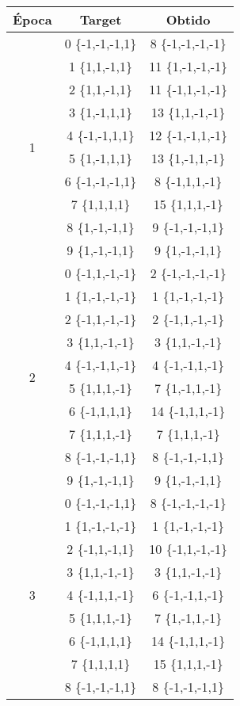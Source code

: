 \begin{table}[H]
\centering
\begin{tabular}{|c|c|c|}
\hline
Época  & Target  &Obtido  \\ \hline
\multirow{10}{*}{1}	 & 0 \{-1,-1,-1,1\} & 8 \{-1,-1,-1,-1\} \\
	 & 1 \{1,1,-1,1\} & 11 \{1,-1,-1,-1\} \\
	 & 2 \{1,1,-1,1\} & 11 \{-1,1,-1,-1\} \\
	 & 3 \{1,-1,1,1\} & 13 \{1,1,-1,-1\} \\
	 & 4 \{-1,-1,1,1\} & 12 \{-1,-1,1,-1\} \\
	 & 5 \{1,-1,1,1\} & 13 \{1,-1,1,-1\} \\
	 & 6 \{-1,-1,-1,1\} & 8 \{-1,1,1,-1\} \\
	 & 7 \{1,1,1,1\} & 15 \{1,1,1,-1\} \\
	 & 8 \{1,-1,-1,1\} & 9 \{-1,-1,-1,1\} \\
	 & 9 \{1,-1,-1,1\} & 9 \{1,-1,-1,1\} \\\hline
\multirow{10}{*}{2}	 & 0 \{-1,1,-1,-1\} & 2 \{-1,-1,-1,-1\} \\
	 & 1 \{1,-1,-1,-1\} & 1 \{1,-1,-1,-1\} \\
	 & 2 \{-1,1,-1,-1\} & 2 \{-1,1,-1,-1\} \\
	 & 3 \{1,1,-1,-1\} & 3 \{1,1,-1,-1\} \\
	 & 4 \{-1,-1,1,-1\} & 4 \{-1,-1,1,-1\} \\
	 & 5 \{1,1,1,-1\} & 7 \{1,-1,1,-1\} \\
	 & 6 \{-1,1,1,1\} & 14 \{-1,1,1,-1\} \\
	 & 7 \{1,1,1,-1\} & 7 \{1,1,1,-1\} \\
	 & 8 \{-1,-1,-1,1\} & 8 \{-1,-1,-1,1\} \\
	 & 9 \{1,-1,-1,1\} & 9 \{1,-1,-1,1\} \\\hline
\multirow{10}{*}{3}	 & 0 \{-1,-1,-1,1\} & 8 \{-1,-1,-1,-1\} \\
	 & 1 \{1,-1,-1,-1\} & 1 \{1,-1,-1,-1\} \\
	 & 2 \{-1,1,-1,1\} & 10 \{-1,1,-1,-1\} \\
	 & 3 \{1,1,-1,-1\} & 3 \{1,1,-1,-1\} \\
	 & 4 \{-1,1,1,-1\} & 6 \{-1,-1,1,-1\} \\
	 & 5 \{1,1,1,-1\} & 7 \{1,-1,1,-1\} \\
	 & 6 \{-1,1,1,1\} & 14 \{-1,1,1,-1\} \\
	 & 7 \{1,1,1,1\} & 15 \{1,1,1,-1\} \\
	 & 8 \{-1,-1,-1,1\} & 8 \{-1,-1,-1,1\} \\

\end{tabular}
\end{table}
